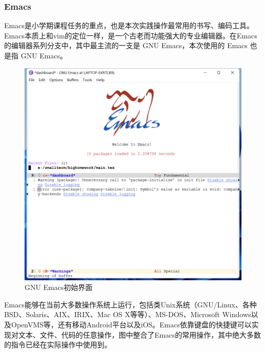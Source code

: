 \documentclass[a4paper]{article}
\begin{document}
  \subsubsection{Emacs}
  Emacs是小学期课程任务的重点，也是本次实践操作最常用的书写、编码工具。Emacs本质上和vim的定位一样，是一个古老而功能强大的专业编辑器。在Emacs的编辑器系列分支中，其中最主流的一支是 GNU Emacs，本次使用的 Emacs 也是指 GNU Emacs。\par
  \begin{figure}[H]
                \centering%
                \includegraphics[width=12cm]{images/Emacs.png}
                \caption{GNU Emacs初始界面}
                \label{fig1}%
            \end{figure}
  Emacs能够在当前大多数操作系统上运行，包括类Unix系统（GNU/Linux、各种BSD、Solaris、AIX、IRIX、Mac OS X等等）、MS-DOS、Microsoft Windows以及OpenVMS等，还有移动Android平台以及iOS。Emacs依靠键盘的快捷键可以实现对文本、文件、代码的任意操作，图中整合了Emacs的常用操作，其中绝大多数的指令已经在实际操作中使用到。\par
\end{document}
